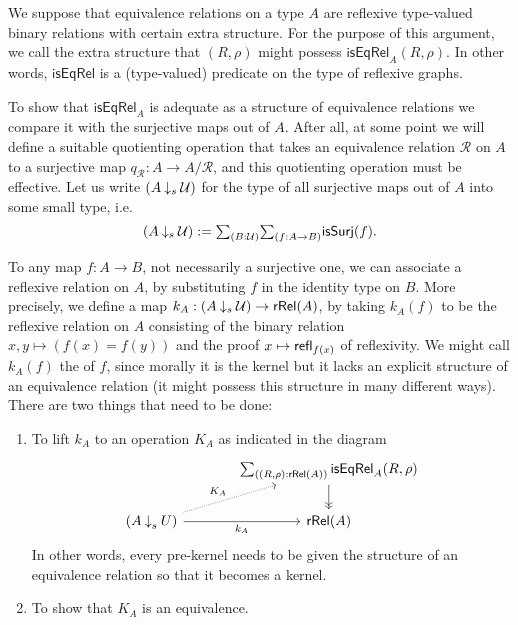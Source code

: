 \documentclass[reqno]{amsart}
\begin{document}
We suppose that equivalence relations on a type $A$ are reflexive type-valued
binary relations with certain extra structure. For the purpose of this argument,
we call the extra structure that $(R,\rho)$ might possess $\mathsf{isEqRel}_A(R,\rho)$.
In other words, $\mathsf{isEqRel}$ is a (type-valued) predicate on the type of
reflexive graphs.

To show that $\mathsf{isEqRel}_A$ is adequate as a structure of equivalence relations
we compare it with the surjective maps out of $A$. After all, at some point we will define a suitable quotienting operation
that takes an equivalence relation $\mathcal{R}$ on $A$ to a surjective map $q_{\mathcal{R}}:A\to A/\mathcal{R}$, and this quotienting operation must be effective.
Let us write $(A \mathbin{\downarrow_s} \mathcal{U})$ for the type of all surjective maps out of $A$ into some small type, i.e.
\begin{equation*}
(A \mathbin{\downarrow_s} \UU) := \sm{B:\UU}{f:A\to{} B}\mathsf{isSurj}(f).
\end{equation*}

To any map $f : A\to{} B$, not necessarily a surjective one, we can associate a reflexive relation on $A$, by substituting $f$ in the identity type on $B$. More precisely, we define a map $k_A :(A \mathbin{\downarrow_s} \mathcal{U}) \to{} \mathsf{rRel}(A)$, by taking $k_A(f)$ to be the reflexive relation on $A$ consisting of the binary relation $x,y \mapsto{} (f(x)=f(y))$ and the proof $x \mapsto \mathsf{refl}_{f(x)}$ of reflexivity. We might call $k_A(f)$ the  of $f$, since morally it is the kernel but it lacks an explicit structure of an equivalence relation (it might possess this structure in many different ways). There are two things that need to be done:
\begin{enumerate}
\item To lift $k_A$ to an operation $K_A$ as indicated in the diagram
\begin{equation*}
\begin{tikzcd}[column sep=large]
& \sm{(R,\rho):\mathsf{rRel}(A)}\mathsf{isEqRel}_A(R,\rho) \arrow[d,->>] \\
(A \mathbin{{\downarrow}_s} U) \arrow[r,swap,"k_A"] \arrow[ur,densely dotted,"K_A"] & \mathsf{rRel}(A)
\end{tikzcd}
\end{equation*}
In other words, every pre-kernel needs to be given the structure of an equivalence relation so that it becomes a kernel.
\item To show that $K_A$ is an equivalence.
\end{enumerate}
\end{document}
